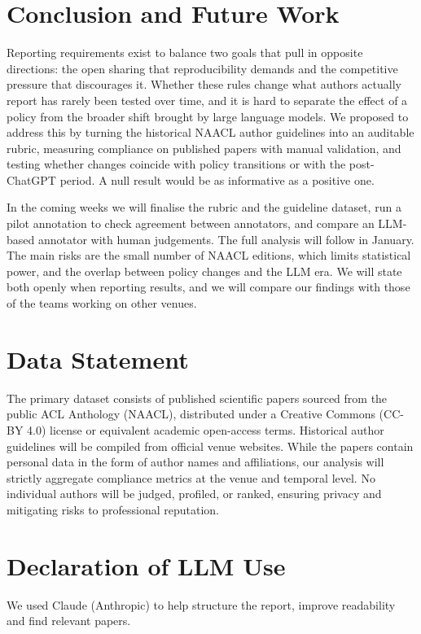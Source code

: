 \documentclass[11pt]{article}
\begin{document}
\section{Conclusion and Future Work}

Reporting requirements exist to balance two goals that pull in opposite directions: the open sharing that reproducibility demands and the competitive pressure that discourages it. Whether these rules change what authors actually report has rarely been tested over time, and it is hard to separate the effect of a policy from the broader shift brought by large language models. We proposed to address this by turning the historical NAACL author guidelines into an auditable rubric, measuring compliance on published papers with manual validation, and testing whether changes coincide with policy transitions or with the post-ChatGPT period. A null result would be as informative as a positive one.

In the coming weeks we will finalise the rubric and the guideline dataset, run a pilot annotation to check agreement between annotators, and compare an LLM-based annotator with human judgements. The full analysis will follow in January. The main risks are the small number of NAACL editions, which limits statistical power, and the overlap between policy changes and the LLM era. We will state both openly when reporting results, and we will compare our findings with those of the teams working on other venues.

\section*{Data Statement}
The primary dataset consists of published scientific papers sourced from the public ACL Anthology (NAACL), distributed under a Creative Commons (CC-BY 4.0) license or equivalent academic open-access terms. Historical author guidelines will be compiled from official venue websites. While the papers contain personal data in the form of author names and affiliations, our analysis will strictly aggregate compliance metrics at the venue and temporal level. No individual authors will be judged, profiled, or ranked, ensuring privacy and mitigating risks to professional reputation.

\section*{Declaration of LLM Use}
We used Claude (Anthropic) to help structure the report, improve readability and find relevant papers.
\end{document}
